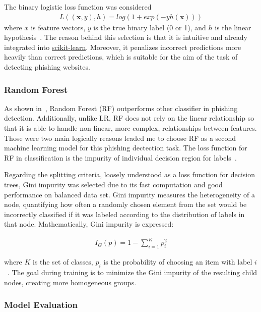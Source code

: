 The binary logistic loss function was considered
\begin{align}
    L((\mathbf{x},y),h) = log(1+exp(-yh(\mathbf{x})))
\end{align}
where $x$ is feature vectors, $y$ is the true binary label (0 or 1), and $h$ is the linear hypothesis~\cite{ml-book}.
The reason behind this selection is that it is intuitive and already integrated into
\href{https://scikit-learn.org/stable/}{scikit-learn}.
Moreover, it penalizes incorrect predictions more heavily than correct predictions, which is suitable for
the aim of the task of detecting phishing websites.

\subsubsection{Random Forest}
As shown in~\cite{CHIEW2019153,SAHINGOZ2019345}, Random Forest (RF) outperforms other
classifier in phishing detection. Additionally, unlike LR, RF does not rely on the
linear relationship so that it is able to handle non-linear, more complex, relationships
between features. Those were two main logically reasons leaded me to choose RF as
a second machine learning model for this phishing dectection task. The loss function for
RF in classification is the impurity of individual decision region for labels~\cite{ml-book}.

Regarding the splitting criteria, loosely understood as a loss function for decision trees,
Gini impurity was selected due to its fast computation and good performance on balanced
data set. Gini impurity measures the heterogeneity of a node, quantifying how often
a randomly chosen element from the set would be incorrectly classified if it was labeled
according to the distribution of labels in that node. Mathematically, Gini impurity is
expressed:

\begin{align}
    I_G(p) = 1 - \sum_{i=1}^{K}p_i^2
\end{align}

where $K$ is the set of classes, $p_i$ is the probability of choosing an item with label
$i$~\cite{gini-formula}. The goal during training is to minimize the Gini impurity of
the resulting child nodes, creating more homogeneous groups.

\subsubsection{Model Evaluation}

